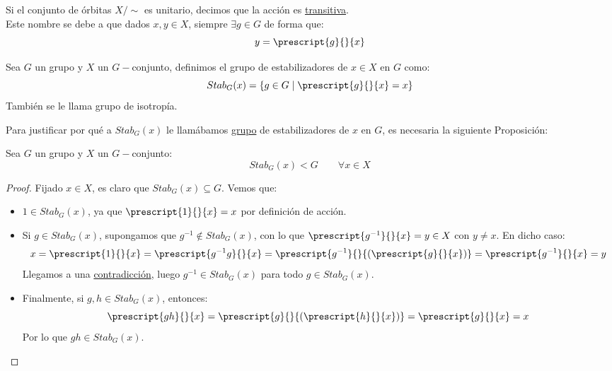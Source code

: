 \begin{definicion}
    Si el conjunto de órbitas $X/\sim$ es unitario, decimos que la acción es \underline{transitiva}.\\

    \noindent
    Este nombre se debe a que dados $x,y\in X$, siempre $\exists g\in G$ de forma que:
    \begin{equation*}
        y = \prescript{g}{}{x}
    \end{equation*}
\end{definicion}

\begin{definicion}[Estabilizador]
    Sea $G$ un grupo y $X$ un $G-$conjunto, definimos el grupo de estabilizadores de $x\in X$ en $G$ como:
    \begin{equation*}
        Stab_G(x) = \{g\in G \mid \prescript{g}{}{x} = x\}
    \end{equation*}
    También se le llama grupo de isotropía.
\end{definicion}

\noindent
Para justificar por qué a $Stab_G(x)$ le llamábamos \underline{grupo} de estabilizadores de $x$ en $G$, es necesaria la siguiente Proposición:
\begin{prop}
    Sea $G$ un grupo y $X$ un $G-$conjunto:
    \begin{equation*}
        Stab_G(x) < G \qquad \forall x\in X
    \end{equation*}
    \begin{proof}
        Fijado $x\in X$, es claro que $Stab_G(x) \subseteq G$. Vemos que:
        \begin{itemize}
            \item $1\in Stab_G(x)$, ya que $\prescript{1}{}{x} = x$ por definición de acción.
            \item Si $g\in Stab_G(x)$, supongamos que $g^{-1}\notin Stab_G(x)$, con lo que $\prescript{g^{-1}}{}{x} = y \in X$ con $y\neq x$. En dicho caso:
                \begin{equation*}
                    x = \prescript{1}{}{x} = \prescript{g^{-1}g}{}{x} = \prescript{g^{-1}}{}{(\prescript{g}{}{x})} = \prescript{g^{-1}}{}{x} = y
                \end{equation*}
                Llegamos a una \underline{contradicción}, luego $g^{-1}\in Stab_G(x)$ para todo $g\in Stab_G(x)$.
            \item Finalmente, si $g,h\in Stab_G(x)$, entonces:
                \begin{equation*}
                    \prescript{gh}{}{x} = \prescript{g}{}{(\prescript{h}{}{x})} = \prescript{g}{}{x} = x
                \end{equation*}
                Por lo que $gh \in Stab_G(x)$.
        \end{itemize}
    \end{proof}
\end{prop}


